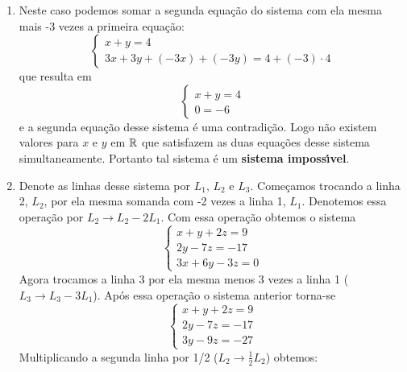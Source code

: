 \begin{exemplos}
    \begin{solucao}
        \begin{enumerate}[label={\arabic*})]
            \item Neste caso podemos somar a segunda equa\c{c}\~ao do sistema com ela mesma mais -3 vezes a primeira equa\c{c}\~ao:
                \[
                    \begin{cases}
                        x + y = 4\\
                        3x + 3y + (-3x) + (-3y) = 4 + (-3)\cdot 4
                    \end{cases}
                \]
            que resulta em
            \[
                \begin{cases}
                    x + y = 4\\
                    0 = -6
                \end{cases}
            \]
            e a segunda equa\c{c}\~ao desse sistema \'e uma contradi\c{c}\~ao. Logo n\~ao existem valores para $x$ e $y$ em $\mathbb{R}$ que satisfazem as duas equa\c{c}\~oes desse sistema simultaneamente. Portanto tal sistema \'e um \textbf{sistema imposs{\'\i}vel}.
                    \item Denote as linhas desse sistema por $L_1$, $L_2$ e $L_3$. Come\c{c}amos trocando a linha 2, $L_2$, por ela mesma somanda com -2 vezes a linha 1, $L_1$. Denotemos essa opera\c{c}\~ao por $L_2 \to L_2 - 2L_1$. Com essa opera\c{c}\~ao obtemos o sistema
                        \[
                            \begin{cases}
                                x + y + 2z = 9\\
                                2y - 7z = -17\\
                                3x + 6y - 3z = 0
                            \end{cases}
                        \]
                        Agora trocamos a linha 3 por ela mesma menos 3 vezes a linha 1 ($L_3 \to L_3 - 3L_1$). Ap\'os essa opera\c{c}\~ao o sistema anterior torna-se
                        \[
                            \begin{cases}
                                x + y + 2z = 9\\
                                2y - 7z = -17\\
                                3y - 9z = -27
                            \end{cases}
                        \]
                        Multiplicando a segunda linha por 1/2 ($L_2 \to \frac{1}{2}L_2$) obtemos:

\end{enumerate}
\end{solucao}
\end{exemplos}
